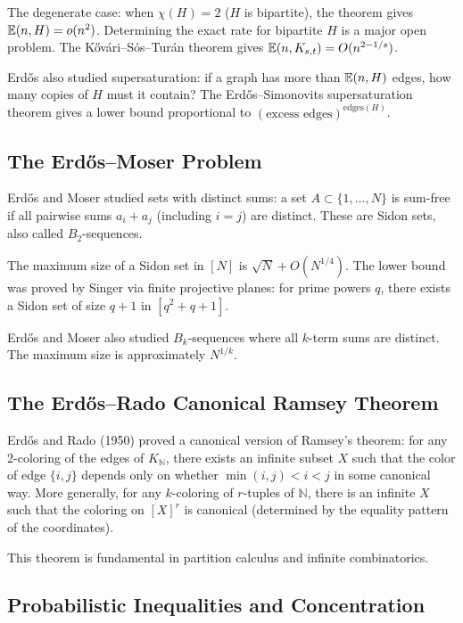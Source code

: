 The degenerate case: when $\chi(H) = 2$ ($H$ is bipartite), the theorem gives $\mathbb{E}(n, H) = o(n^2)$. Determining the exact rate for bipartite $H$ is a major open problem. The K\H{o}v\'{a}ri--S\'{o}s--Tur\'{a}n theorem gives $\mathbb{E}(n, K_{s,t}) = O(n^{2-1/s})$.

Erd\H{o}s also studied supersaturation: if a graph has more than $\mathbb{E}(n, H)$ edges, how many copies of $H$ must it contain? The Erd\H{o}s--Simonovits supersaturation theorem gives a lower bound proportional to $(\text{excess edges})^{\text{edges}(H)}$.

\subsection{The Erd\H{o}s--Moser Problem}

Erd\H{o}s and Moser studied sets with distinct sums: a set $A \subset \{1, \ldots, N\}$ is sum-free if all pairwise sums $a_i + a_j$ (including $i=j$) are distinct. These are Sidon sets, also called $B_2$-sequences.

The maximum size of a Sidon set in $[N]$ is $\sqrt{N} + O(N^{1/4})$. The lower bound was proved by Singer via finite projective planes: for prime powers $q$, there exists a Sidon set of size $q+1$ in $[q^2+q+1]$.

Erd\H{o}s and Moser also studied $B_k$-sequences where all $k$-term sums are distinct. The maximum size is approximately $N^{1/k}$.

\subsection{The Erd\H{o}s--Rado Canonical Ramsey Theorem}

Erd\H{o}s and Rado (1950) proved a canonical version of Ramsey's theorem: for any 2-coloring of the edges of $K_\mathbb{N}$, there exists an infinite subset $X$ such that the color of edge $\{i,j\}$ depends only on whether $\min(i,j) < i < j$ in some canonical way. More generally, for any $k$-coloring of $r$-tuples of $\mathbb{N}$, there is an infinite $X$ such that the coloring on $[X]^r$ is canonical (determined by the equality pattern of the coordinates).

This theorem is fundamental in partition calculus and infinite combinatorics.

\subsection{Probabilistic Inequalities and Concentration}

